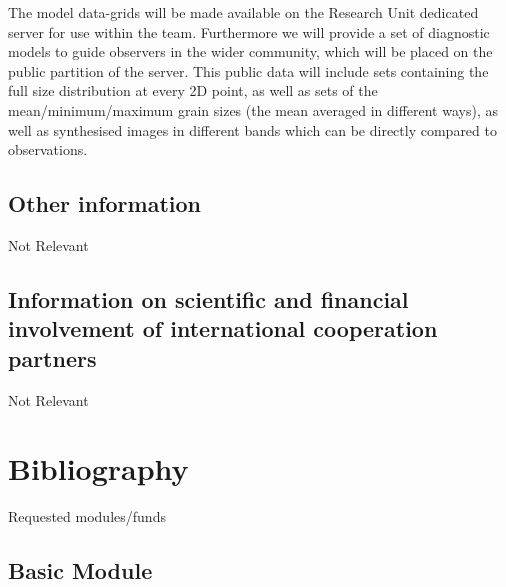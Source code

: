 \documentclass[10pt,fleqn,twoside]{article}
\begin{document}
The model data-grids will be made available on the Research Unit
dedicated server for use within the team. Furthermore we will provide
a set of diagnostic models to guide observers in the wider community,
which will be placed 
on the public partition of the server.
This public data will include sets containing the full size
distribution at every 2D point, as well as sets of the
mean/minimum/maximum grain sizes (the mean averaged in different
ways), as well as synthesised images in different bands which can be
directly compared to observations. 

\subsection{Other information}

Not Relevant

\subsection{Information on scientific and financial involvement of international cooperation partners}

Not Relevant

\section{Bibliography}


\begingroup
\renewcommand{\section}[2]{}%


\endgroup

\section{Requested modules/funds}
\renewcommand{\leftmark}{\sc  Requested modules/funds}

\subsection{Basic Module}
\end{document}
